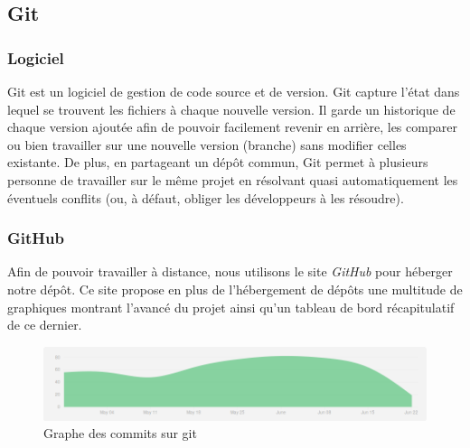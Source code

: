 \subsection{Git}
\subsubsection{Logiciel}
Git est un logiciel de gestion de code source et de version. Git capture l'état dans lequel se trouvent les fichiers à chaque nouvelle version. Il garde un historique de chaque version ajoutée afin de pouvoir facilement revenir en arrière, les comparer ou bien travailler sur une nouvelle version (branche) sans modifier celles existante. De plus, en partageant un dépôt commun, Git permet à plusieurs personne de travailler sur le même projet en résolvant quasi automatiquement les éventuels conflits (ou, à défaut, obliger les développeurs à les résoudre).

\subsubsection{GitHub}
Afin de pouvoir travailler à distance, nous utilisons le site \textit{GitHub} pour héberger notre dépôt.
Ce site propose en plus de l'hébergement de dépôts une multitude de graphiques montrant l'avancé du projet ainsi qu'un tableau de bord récapitulatif de ce dernier.

\begin{figure}[h!]
	\centering
	\includegraphics[width=\textwidth]{img/graph_commit.png}
	\caption{Graphe des commits sur git}
	\label{fig:commit}
\end{figure}
